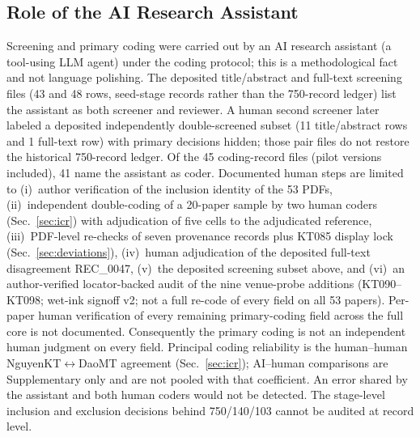 \documentclass[lettersize,journal]{IEEEtran}
\begin{document}
\subsection{Role of the AI Research Assistant}
\label{sec:ai_role}
Screening and primary coding were carried out by an AI research assistant (a tool-using LLM agent) under the coding protocol; this is a methodological fact and not language polishing. The deposited title/abstract and full-text screening files (43 and 48 rows, seed-stage records rather than the 750-record ledger) list the assistant as both screener and reviewer. A human second screener later labeled a deposited independently double-screened subset (11 title/abstract rows and 1 full-text row) with primary decisions hidden; those pair files do not restore the historical 750-record ledger. Of the 45 coding-record files (pilot versions included), 41 name the assistant as coder. Documented human steps are limited to (i)~author verification of the inclusion identity of the 53 PDFs, (ii)~independent double-coding of a 20-paper sample by two human coders (Sec.~\ref{sec:icr}) with adjudication of five cells to the adjudicated reference, (iii)~PDF-level re-checks of seven provenance records plus KT085 display lock (Sec.~\ref{sec:deviations}), (iv)~human adjudication of the deposited full-text disagreement REC\_0047, (v)~the deposited screening subset above, and (vi)~an author-verified locator-backed audit of the nine venue-probe additions (KT090--KT098; wet-ink signoff v2; not a full re-code of every field on all 53 papers). Per-paper human verification of every remaining primary-coding field across the full core is not documented. Consequently the primary coding is not an independent human judgment on every field. Principal coding reliability is the human--human NguyenKT$\leftrightarrow$DaoMT agreement (Sec.~\ref{sec:icr}); AI--human comparisons are Supplementary only and are not pooled with that coefficient. An error shared by the assistant and both human coders would not be detected. The stage-level inclusion and exclusion decisions behind 750/140/103 cannot be audited at record level.
\end{document}
